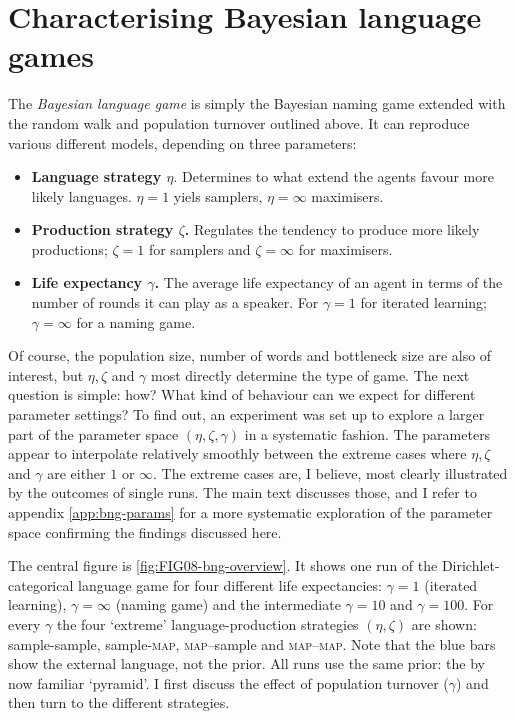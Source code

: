\documentclass{../src/bcthesispart}
\begin{document}
\section{Characterising Bayesian language games}



The \emph{Bayesian language game} is simply the Bayesian naming game extended with the random walk and population turnover outlined above.
It can reproduce various different models, depending on three parameters:
\begin{itemize}
	\item \textbf{Language strategy $\eta$}. Determines to what extend the agents favour more likely languages. $\eta=1$ yiels samplers, $\eta=\infty$ maximisers.
	\item \textbf{Production strategy $\zeta$.} Regulates the tendency to produce more likely productions; $\zeta=1$ for samplers and $\zeta=\infty$ for maximisers.
	\item \textbf{Life expectancy $\gamma$.} The average life expectancy of an agent in terms of the number of rounds it can play as a speaker. For $\gamma=1$ for iterated learning; $\gamma=\infty$ for a naming game.
\end{itemize}
Of course, the population size, number of words and bottleneck size are also of interest, but $\eta, \zeta$ and $\gamma$ most directly determine the type of game.
The next question is simple: how?
What kind of behaviour can we expect for different parameter settings?
To find out, an experiment was set up to explore a larger part of the parameter space $(\eta, \zeta, \gamma)$ in a systematic fashion.
The parameters appear to interpolate relatively smoothly between the extreme cases where $\eta,\zeta$ and $\gamma$ are either $1$ or $\infty$.
The extreme cases are, I believe, most clearly illustrated by the outcomes of single runs.
The main text discusses those, and I refer to appendix \ref{app:bng-params} for a more systematic exploration of the parameter space confirming the findings discussed here.




The central figure is \ref{fig:FIG08-bng-overview}.
It shows one run of the Dirichlet-categorical language game for four different life expectancies: $\gamma=1$ (iterated learning), $\gamma=\infty$ (naming game) and the intermediate $\gamma=10$ and $\gamma=100$.
For every $\gamma$ the four ‘extreme’ language-production strategies $(\eta,\zeta)$ are shown: sample-sample, sample-\textsc{map}, \textsc{map}--sample and \textsc{map--map}.
Note that the blue bars show the external language, not the prior.
All runs use the same prior: the by now familiar ‘pyramid’.
I first discuss the effect of population turnover ($\gamma$) and then turn to the different strategies.
\end{document}
